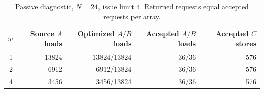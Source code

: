 \begin{table}[!t]
\centering
\caption{Passive diagnostic, $N=24$, issue limit 4. Returned requests equal accepted requests per array.}
\label{tab:graph}
\footnotesize
\setlength{\tabcolsep}{4pt}
\begin{tabular}{rrrrr}\toprule
$w$ & \shortstack{Source $A$\\loads} & \shortstack{Optimized\\$A/B$ loads} & \shortstack{Accepted\\$A/B$ loads} & \shortstack{Accepted\\$C$ stores} \\ \midrule
1 & 13824 & 13824/13824 & 36/36 & 576 \\
2 & 6912 & 6912/13824 & 36/36 & 576 \\
4 & 3456 & 3456/13824 & 36/36 & 576 \\
\bottomrule
\end{tabular}
\end{table}

